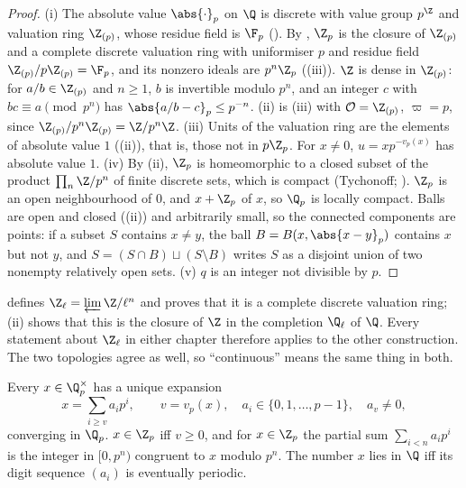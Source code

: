 \begin{proof}
(i) The absolute value $\abs{\cdot}_p$ on $\Q$ is discrete with value group $p^{\Z}$ and valuation ring $\Z_{(p)}$, whose residue field is $\F_p$
(). By , $\Z_p$ is the closure of $\Z_{(p)}$ and a complete discrete valuation ring with uniformiser $p$
and residue field $\Z_{(p)}/p\Z_{(p)}=\F_p$, and its nonzero ideals are $p^n\Z_p$ ((iii)). $\Z$ is dense in $\Z_{(p)}$:
for $a/b\in\Z_{(p)}$ and $n\ge1$, $b$ is invertible modulo $p^n$, and an integer $c$ with $bc\equiv a\pmod{p^n}$ has $\abs{a/b-c}_p\le p^{-n}$.
(ii) is (iii) with $\mathcal O=\Z_{(p)}$, $\varpi=p$, since $\Z_{(p)}/p^n\Z_{(p)}=\Z/p^n\Z$.
(iii) Units of the valuation ring are the elements of absolute value $1$ ((ii)), that is, those not in $p\Z_p$.
For $x\ne0$, $u=xp^{-v_p(x)}$ has absolute value $1$. (iv) By (ii), $\Z_p$ is homeomorphic to a closed subset of the product
$\prod_n\Z/p^n$ of finite discrete sets, which is compact (Tychonoff; ). $\Z_p$ is an open neighbourhood of $0$, and
$x+\Z_p$ of $x$, so $\Q_p$ is locally compact. Balls are open and closed ((ii)) and arbitrarily small, so
the connected components are points: if a subset $S$ contains $x\ne y$, the ball $B=B(x,\abs{x-y}_p)$ contains $x$ but not $y$, and
$S=(S\cap B)\sqcup(S\setminus B)$ writes $S$ as a disjoint union of two nonempty relatively open sets. (v) $q$ is an integer not divisible by $p$.
\end{proof}

\begin{warning}\label{warn:local:analytic}
 defines $\Z_\ell=\varprojlim\Z/\ell^n$ and proves that it is a complete discrete valuation ring; (ii) shows
that this is the closure of $\Z$ in the completion $\Q_\ell$ of $\Q$. Every statement about $\Z_\ell$ in either chapter therefore applies to the
other construction. The two topologies agree as well, so ``continuous'' means the same thing in both.
\end{warning}

\begin{proposition}\label{prop:local:expansions}
Every $x\in\Q_p^\times$ has a unique expansion
\[
x=\sum_{i\ge v}a_ip^i,\qquad v=v_p(x),\quad a_i\in\{0,1,\dots,p-1\},\quad a_v\ne0,
\]
converging in $\Q_p$. $x\in\Z_p$ iff $v\ge0$, and for $x\in\Z_p$ the partial sum $\sum_{i<n}a_ip^i$ is the integer in $[0,p^n)$ congruent to
$x$ modulo $p^n$. The number $x$ lies in $\Q$ iff its digit sequence $(a_i)$ is eventually periodic.
\end{proposition}

